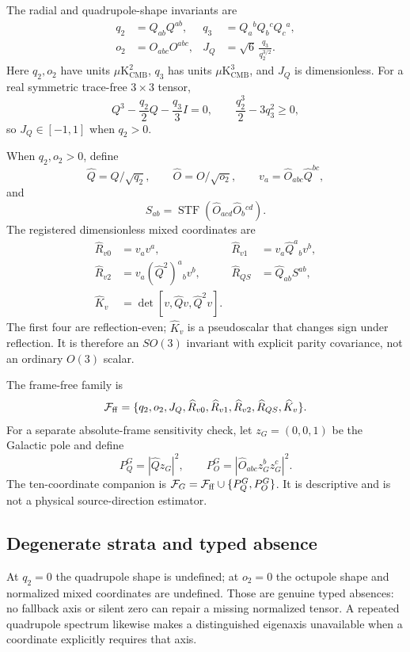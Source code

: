 \documentclass[11pt,a4paper]{article}
\newcommand{\stf}{\operatorname{STF}}
\newcommand{\microK}{\mu\mathrm{K}_{\mathrm{CMB}}}
\begin{document}
The radial and quadrupole-shape invariants are
\begin{align}
q_2&=Q_{ab}Q^{ab},&
q_3&=Q_a{}^bQ_b{}^cQ_c{}^a,\\
o_2&=O_{abc}O^{abc},&
J_Q&=\sqrt6\,\frac{q_3}{q_2^{3/2}}.
\end{align}
Here $q_2,o_2$ have units $\microK^2$, $q_3$ has units $\microK^3$, and
$J_Q$ is dimensionless.  For a real symmetric trace-free $3\times3$ tensor,
\[
Q^3-\frac{q_2}{2}Q-\frac{q_3}{3}I=0,
\qquad \frac{q_2^3}{2}-3q_3^2\ge0,
\]
so $J_Q\in[-1,1]$ when $q_2>0$.

When $q_2,o_2>0$, define
\[
\widehat Q=Q/\sqrt{q_2},\qquad
\widehat O=O/\sqrt{o_2},\qquad
v_a=\widehat O_{abc}\widehat Q^{bc},
\]
and
\[
S_{ab}=\stf(\widehat O_{acd}\widehat O_b{}^{cd}).
\]
The registered dimensionless mixed coordinates are
\begin{align}
\widehat R_{v0}&=v_av^a,&
\widehat R_{v1}&=v_a\widehat Q^a{}_bv^b,\\
\widehat R_{v2}&=v_a(\widehat Q^2)^a{}_bv^b,&
\widehat R_{QS}&=\widehat Q_{ab}S^{ab},\\
\widehat K_v&=\det[v,\widehat Qv,\widehat Q^2v].
\end{align}
The first four are reflection-even; $\widehat K_v$ is a pseudoscalar that
changes sign under reflection.  It is therefore an $SO(3)$ invariant with
explicit parity covariance, not an ordinary $O(3)$ scalar.

The frame-free family is
\begin{equation}
\mathcal F_{\rm ff}=
\{q_2,o_2,J_Q,\widehat R_{v0},\widehat R_{v1},
\widehat R_{v2},\widehat R_{QS},\widehat K_v\}.
\label{eq:framefree-family}
\end{equation}
For a separate absolute-frame sensitivity check, let
$z_G=(0,0,1)$ be the Galactic pole and define
\[
P_Q^G=|\widehat Qz_G|^2,
\qquad P_O^G=|\widehat O_{abc}z_G^bz_G^c|^2.
\]
The ten-coordinate companion is
$\mathcal F_G=\mathcal F_{\rm ff}\cup\{P_Q^G,P_O^G\}$.
It is descriptive and is not a physical source-direction estimator.

\subsection{Degenerate strata and typed absence}

At $q_2=0$ the quadrupole shape is undefined; at $o_2=0$ the octupole shape
and normalized mixed coordinates are undefined.  Those are genuine typed
absences: no fallback axis or silent zero can repair a missing normalized
tensor.  A repeated quadrupole spectrum likewise makes a distinguished
eigenaxis unavailable when a coordinate explicitly requires that axis.
\end{document}
